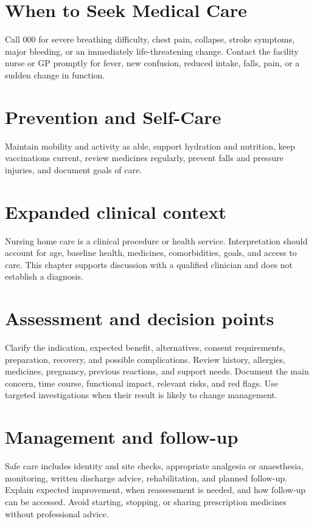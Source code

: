 \section*{When to Seek Medical Care}
Call 000 for severe breathing difficulty, chest pain, collapse, stroke symptoms, major bleeding, or an immediately life-threatening change. Contact the facility nurse or GP promptly for fever, new confusion, reduced intake, falls, pain, or a sudden change in function.

\section*{Prevention and Self-Care}
Maintain mobility and activity as able, support hydration and nutrition, keep vaccinations current, review medicines regularly, prevent falls and pressure injuries, and document goals of care.

\section*{Expanded clinical context}
Nursing home care is a clinical procedure or health service. Interpretation should account for age, baseline health, medicines, comorbidities, goals, and access to care. This chapter supports discussion with a qualified clinician and does not establish a diagnosis.

\section*{Assessment and decision points}
Clarify the indication, expected benefit, alternatives, consent requirements, preparation, recovery, and possible complications. Review history, allergies, medicines, pregnancy, previous reactions, and support needs. Document the main concern, time course, functional impact, relevant risks, and red flags. Use targeted investigations when their result is likely to change management.

\section*{Management and follow-up}
Safe care includes identity and site checks, appropriate analgesia or anaesthesia, monitoring, written discharge advice, rehabilitation, and planned follow-up. Explain expected improvement, when reassessment is needed, and how follow-up can be accessed. Avoid starting, stopping, or sharing prescription medicines without professional advice.

